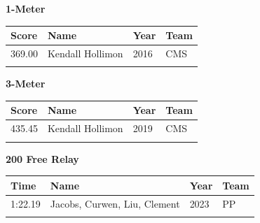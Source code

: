 \vspace{1.2em}
\noindent\begin{minipage}[t]{0.98\textwidth}
\centering
\textbf{\textcolor{teamprimary}{1-Meter}}\par
\vspace{0.5em}
\centering
\small
\renewcommand{\arraystretch}{1.0}
\setlength{\tabcolsep}{4pt}
\begin{tabular}{@{}p{2.5cm}p{4.5cm}p{1.5cm}p{2.5cm}@{}}
\toprule
\textbf{Score} & \textbf{Name} & \textbf{Year} & \textbf{Team} \\
\midrule
369.00 & Kendall Hollimon & 2016 & CMS \\
\bottomrule
\vspace{0.5em}
\end{tabular}
\end{minipage}
\vspace{1.2em}
\noindent\begin{minipage}[t]{0.98\textwidth}
\centering
\textbf{\textcolor{teamprimary}{3-Meter}}\par
\vspace{0.5em}
\centering
\small
\renewcommand{\arraystretch}{1.0}
\setlength{\tabcolsep}{4pt}
\begin{tabular}{@{}p{2.5cm}p{4.5cm}p{1.5cm}p{2.5cm}@{}}
\toprule
\textbf{Score} & \textbf{Name} & \textbf{Year} & \textbf{Team} \\
\midrule
435.45 & Kendall Hollimon & 2019 & CMS \\
\bottomrule
\vspace{0.5em}
\end{tabular}
\end{minipage}
\vspace{1.2em}
\noindent\begin{minipage}[t]{0.98\textwidth}
\centering
\textbf{\textcolor{teamprimary}{200 Free Relay}}\par
\vspace{0.5em}
\centering
\small
\renewcommand{\arraystretch}{1.0}
\setlength{\tabcolsep}{4pt}
\begin{tabular}{@{}p{2.7cm}p{4.3cm}p{1.6cm}p{2.7cm}@{}}
\toprule
\textbf{Time} & \textbf{Name} & \textbf{Year} & \textbf{Team} \\
\midrule
1:22.19 & Jacobs, Curwen, Liu, Clement & 2023 & PP \\
\bottomrule
\vspace{0.5em}
\end{tabular}
\end{minipage}
\vspace{1.2em}
